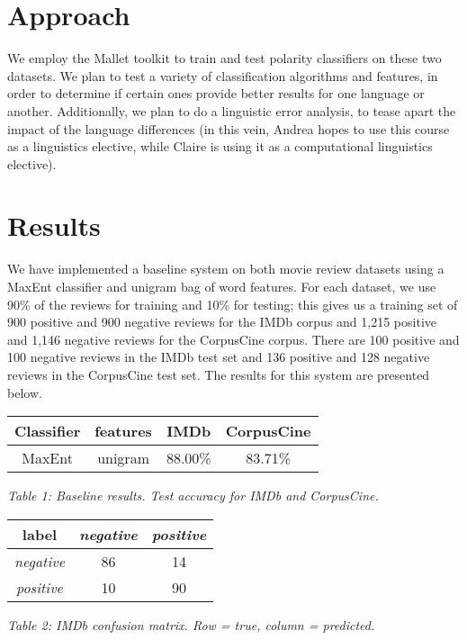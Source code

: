 \documentclass[11pt]{article}
\begin{document}
\section{Approach}

We employ the Mallet toolkit to train and test polarity classifiers on these two datasets.  We plan to test a variety of classification algorithms and features, in order to determine if certain ones provide better results for one language or another.  Additionally, we plan to do a linguistic error analysis, to tease apart the impact of the language differences (in this vein, Andrea hopes to use this course as a linguistics elective, while Claire is using it as a computational linguistics elective).

\section{Results}

We have implemented a baseline system on both movie review datasets using a MaxEnt classifier and unigram bag of word features.  For each dataset, we use 90\% of the reviews for training and 10\% for testing; this gives us a training set of 900 positive and 900 negative reviews for the IMDb corpus and 1,215 positive and 1,146 negative reviews for the CorpusCine corpus.  There are 100 positive and 100 negative reviews in the IMDb test set and 136 positive and 128 negative reviews in the CorpusCine test set.  The results for this system are presented below.

\vspace{5mm}
{\centering
\begin{tabular}{|c|c|c|c|}
\hline
\textbf{Classifier} & \textbf{features} & \textbf{IMDb} & \textbf{CorpusCine} \\ \hline
MaxEnt & unigram & 88.00\% & 83.71\% \\ \hline
\end{tabular}

\vspace{1mm}
\emph{Table 1: Baseline results.  Test accuracy for IMDb and CorpusCine.}
\par}

\vspace{5mm}
{\centering
\begin{tabular}{|c|c|c|}
\hline
\textbf{label} & \emph{negative} & \emph{positive} \\ \hline
\emph{negative} & 86 & 14 \\ \hline
\emph{positive} & 10 & 90 \\ \hline
\end{tabular}

\vspace{1mm}
\emph{Table 2: IMDb confusion matrix. Row = true, column = predicted.}
\par}
\end{document}
